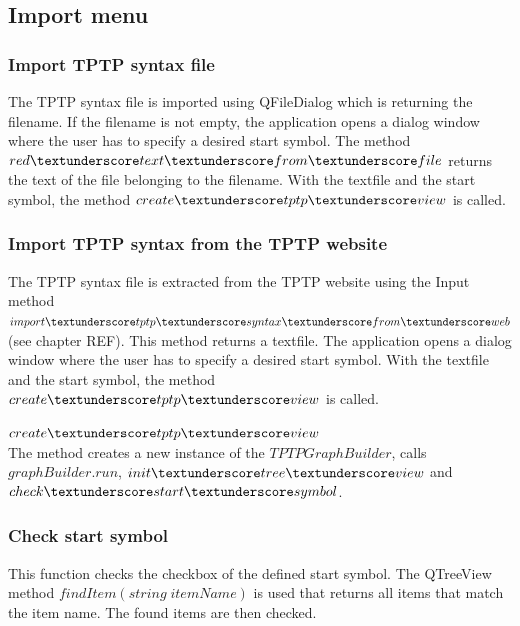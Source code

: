 \subsection{Import menu}\label{sec:ImplementationGUIImportMenu}	
\subsubsection{Import \ac{TPTP} syntax file}\label{sec:ImplementationGUIImportFile}

The \ac{TPTP} syntax file is imported using QFileDialog which is returning the filename. If the filename is not empty, the application opens a dialog window where the user has to specify a desired start symbol. The method $red\textunderscore text\textunderscore from\textunderscore file$ returns the text of the file belonging to the filename. With the textfile and the start symbol, the method $create\textunderscore tptp\textunderscore view$ is called.

\subsubsection{Import \ac{TPTP} syntax from the \ac{TPTP} website}\label{sec:ImplementationGUIImportInternet}

The \ac{TPTP} syntax file is extracted from the \ac{TPTP} website using the Input method $import\textunderscore tptp\textunderscore syntax\textunderscore from\textunderscore web$ (see chapter REF). This method returns a textfile. The application opens a dialog window where the user has to specify a desired start symbol. With the textfile and the start symbol, the method $create\textunderscore tptp\textunderscore view$ is called.

$create\textunderscore tptp\textunderscore view$ \\
The method creates a new instance of the $TPTPGraphBuilder$, calls $graphBuilder.run$, $init\textunderscore tree\textunderscore view$ and $check\textunderscore start\textunderscore symbol$.

\subsubsection{Check start symbol}\label{sec:ImplementationGUIStartsymbol}

This function checks the checkbox of the defined start symbol. The QTreeView method $findItem(string\; itemName)$ is used that returns all items that match the item name. 
The found items are then checked.

